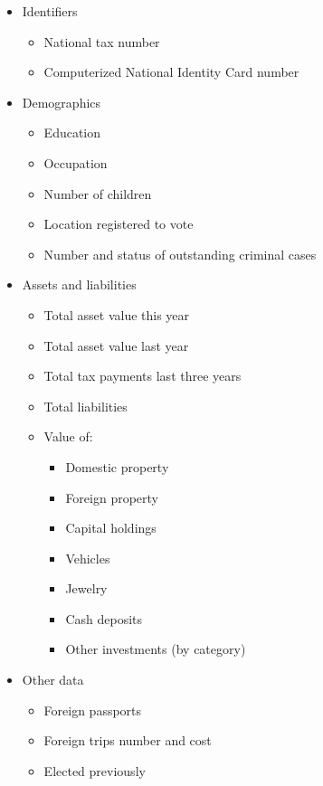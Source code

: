 \documentclass[]{article}
\providecommand{\tightlist}{%
  \setlength{\itemsep}{0pt}\setlength{\parskip}{0pt}}
\begin{document}
\begin{itemize}
\tightlist
\item
  Identifiers

  \begin{itemize}
  \tightlist
  \item
    National tax number
  \item
    Computerized National Identity Card number
  \end{itemize}
\item
  Demographics

  \begin{itemize}
  \tightlist
  \item
    Education
  \item
    Occupation
  \item
    Number of children
  \item
    Location registered to vote
  \item
    Number and status of outstanding criminal cases
  \end{itemize}
\item
  Assets and liabilities

  \begin{itemize}
  \tightlist
  \item
    Total asset value this year
  \item
    Total asset value last year
  \item
    Total tax payments last three years
  \item
    Total liabilities
  \item
    Value of:

    \begin{itemize}
    \tightlist
    \item
      Domestic property
    \item
      Foreign property
    \item
      Capital holdings
    \item
      Vehicles
    \item
      Jewelry
    \item
      Cash deposits
    \item
      Other investments (by category)
    \end{itemize}
  \end{itemize}
\item
  Other data

  \begin{itemize}
  \tightlist
  \item
    Foreign passports
  \item
    Foreign trips number and cost
  \item
    Elected previously
  \end{itemize}
\end{itemize}
\end{document}
